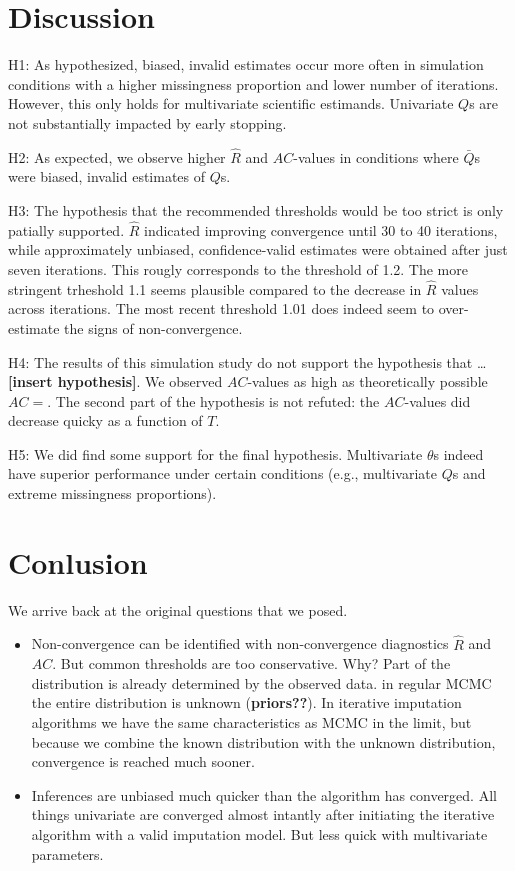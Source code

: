 \documentclass[Royal,times,sageh]{sagej}
\begin{document}
\hypertarget{discussion}{%
\section{Discussion}\label{discussion}}

H1: As hypothesized, biased, invalid estimates occur more often in simulation conditions with a higher missingness proportion and lower number of iterations. However, this only holds for multivariate scientific estimands. Univariate \(Q\)s are not substantially impacted by early stopping.

H2: As expected, we observe higher \(\widehat{R}\) and \(AC\)-values in conditions where \(\bar{Q}\)s were biased, invalid estimates of \(Q\)s.

H3: The hypothesis that the recommended thresholds would be too strict is only patially supported. \(\widehat{R}\) indicated improving convergence until 30 to 40 iterations, while approximately unbiased, confidence-valid estimates were obtained after just seven iterations. This rougly corresponds to the threshold of 1.2. The more stringent trheshold 1.1 seems plausible compared to the decrease in \(\widehat{R}\) values across iterations. The most recent threshold 1.01 does indeed seem to over-estimate the signs of non-convergence.

H4: The results of this simulation study do not support the hypothesis that \ldots{} \textbf{{[}insert hypothesis{]}}. We observed \(AC\)-values as high as theoretically possible \(AC=\). The second part of the hypothesis is not refuted: the \(AC\)-values did decrease quicky as a function of \(T\).

H5: We did find some support for the final hypothesis. Multivariate \(\theta\)s indeed have superior performance under certain conditions (e.g., multivariate \(Q\)s and extreme missingness proportions).

\hypertarget{conlusion}{%
\section{Conlusion}\label{conlusion}}

We arrive back at the original questions that we posed.

\begin{itemize}
\item
  Non-convergence can be identified with non-convergence diagnostics \(\widehat{R}\) and \(AC\). But common thresholds are too conservative. Why? Part of the distribution is already determined by the observed data. in regular MCMC the entire distribution is unknown (\textbf{priors??}). In iterative imputation algorithms we have the same characteristics as MCMC in the limit, but because we combine the known distribution with the unknown distribution, convergence is reached much sooner.
\item
  Inferences are unbiased much quicker than the algorithm has converged. All things univariate are converged almost intantly after initiating the iterative algorithm with a valid imputation model. But less quick with multivariate parameters.
\end{itemize}
\end{document}
